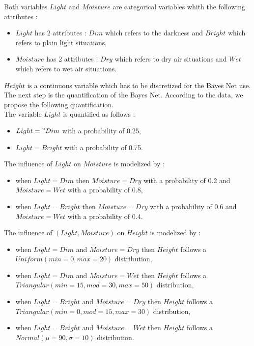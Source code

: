 Both variables $Light$ and $Moisture$ are categorical variables whith the following attributes :  
\begin{itemize}
   \item $Light$ has 2 attributes : $Dim$ which refers to the darkness and $Bright$ which refers to plain light situations,
   \item $Moisture$ has 2 attributes : $Dry$ which refers to dry air situations and $Wet$ which refers to wet air situations.
\end{itemize}
$Height$ is a continuous variable which has to be discretized for the Bayes Net use. \\

The next step is the quantification of the  Bayes Net. According to the data, we propose the following quantification. \\
The variable $Light$ is quantified as follows : 
\begin{itemize}
   \item  $Light="Dim$ with a probability of 0.25,
   \item  $Light=Bright$ with a probability of 0.75.
\end{itemize}

The influence of $Light$ on $Moisture$ is modelized by :
\begin{itemize}
   \item when $Light=Dim$ then  $Moisture=Dry$ with a probability of 0.2 and  $Moisture=Wet$ with a probability of 0.8,
   \item when $Light=Bright$ then  $Moisture=Dry$ with a probability of 0.6 and  $Moisture=Wet$ with a probability of 0.4.
\end{itemize}

The influence of $(Light, Moisture)$ on $Height$ is modelized by :
\begin{itemize}
   \item when $Light=Dim$ and $Moisture=Dry$ then $Height$ follows a $Uniform(min=0, max=20)$ distribution,
   \item when $Light=Dim$ and $Moisture=Wet$ then $Height$ follows a $Triangular(min=15, mod=30, max=50)$ distribution,
   \item when $Light=Bright$ and $Moisture=Dry$ then $Height$ follows a $Triangular(min=0, mod=15, max=30)$ distribution,
   \item when $Light=Bright$ and $Moisture=Wet$ then $Height$ follows a $Normal(\mu=90, \sigma=10)$ distribution.
\end{itemize}


